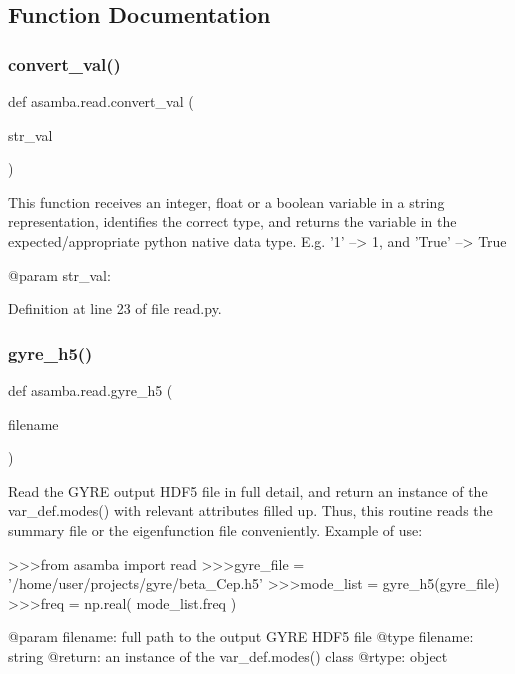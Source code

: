 \subsection{Function Documentation}
\mbox{\label{namespaceasamba_1_1read_ace4b0a61b1709d8ed716d72ee1970116}} 
\subsubsection{\texorpdfstring{convert\+\_\+val()}{convert\_val()}}
{\footnotesize\ttfamily def asamba.\+read.\+convert\+\_\+val (\begin{DoxyParamCaption}\item[{}]{str\+\_\+val }\end{DoxyParamCaption})}

\begin{DoxyVerb}This function receives an integer, float or a boolean variable in a string representation, identifies
the correct type, and returns the variable in the expected/appropriate python native data type. 
E.g. '1' --> 1, and 'True' --> True

@param str_val: 
\end{DoxyVerb}
 

Definition at line 23 of file read.\+py.

\mbox{\label{namespaceasamba_1_1read_a9d452d521d54c77714542bea2e6e93fa}} 
\subsubsection{\texorpdfstring{gyre\+\_\+h5()}{gyre\_h5()}}
{\footnotesize\ttfamily def asamba.\+read.\+gyre\+\_\+h5 (\begin{DoxyParamCaption}\item[{}]{filename }\end{DoxyParamCaption})}

\begin{DoxyVerb}Read the GYRE output HDF5 file in full detail, and return an instance of the var_def.modes() with
relevant attributes filled up. Thus, this routine reads the summary file or the eigenfunction file
conveniently. Example of use:

>>>from asamba import read
>>>gyre_file = '/home/user/projects/gyre/beta_Cep.h5'
>>>mode_list = gyre_h5(gyre_file)
>>>freq      = np.real( mode_list.freq )

@param filename: full path to the output GYRE HDF5 file
@type filename: string
@return: an instance of the var_def.modes() class
@rtype: object
\end{DoxyVerb}
 

